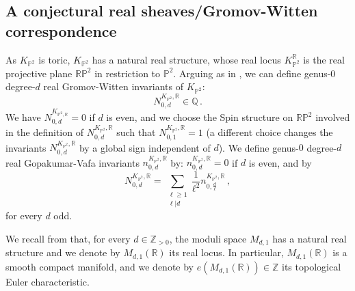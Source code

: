 \documentclass[11pt,letterpaper]{amsart}
\newcommand\PP{\mathbb P}
\newcommand\R{\mathbb R}
\newcommand\Q{\mathbb Q}
\newcommand\Z{\mathbb Z}
\begin{document}
\begin{center}
\end{center}





\subsection{A conjectural real sheaves/Gromov-Witten correspondence}
\label{section_real_gw}

As $K_{\PP^2}$ is toric, $K_{\PP^2}$ has a natural real structure, whose real locus 
$K_{\PP^2}^{\R}$ is the real projective plane 
$\R \PP^2$ in restriction to $\PP^2$.
Arguing as in \cite{MR2425184}, we can define genus-$0$ degree-$d$ real Gromov-Witten invariants of $K_{\PP^2}$:
\[ N_{0,d}^{K_{\PP^2},\R} \in \Q\,.\]
We have $N_{0,d}^{K_{\PP^2,\R}}=0$ if $d$ is even, and we choose the Spin structure on $\R \PP^2$ involved in the definition of 
$N_{0,d}^{K_{\PP^2},\R}$ such that 
$N_{0,1}^{K_{\PP^2},\R}=1$
(a different choice changes the invariants 
$N_{0,d}^{K_{\PP^2},\R}$ by a global sign independent of $d$).
We define genus-$0$ degree-$d$ real Gopakumar-Vafa invariants 
$n_{0,d}^{K_{\PP^2},\R}$ by:
$n_{0,d}^{K_{\PP^2},\R}=0$ if $d$ is even, and by
\[ N_{0,d}^{K_{\PP^2},\R}
=\sum_{\substack{\ell \geqslant 1\\\ell|d}} \frac{1}{\ell^2} 
n_{0,\frac{d}{\ell}}^{K_{\PP^2},\R}\,,\]
for every $d$ odd.


We recall from  \cite[\S 6.2]{bousseau2019scattering} that, for every $d\in \Z_{>0}$,  the moduli space $M_{d,1}$ has a natural real structure and we denote by $M_{d,1}(\R)$ its real locus.
In particular, 
$M_{d,1}(\R)$ is a smooth compact manifold, and we denote by 
$e(M_{d,1}(\R)) \in \Z$ its topological Euler characteristic.
\end{document}
